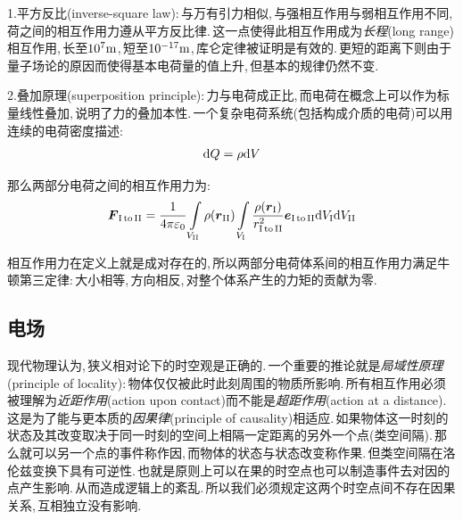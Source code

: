 1.{\hei 平方反比(inverse-square law)}:\,与万有引力相似,\,与强相互作用与弱相互作用不同,\,荷之间的相互作用力遵从平方反比律.\,这一点使得此相互作用成为\emph{长程}(long range)相互作用,\,长至\(10^7{\rm m}\),\,短至\(10^{-17}{\rm m}\),\,库仑定律被证明是有效的.\,更短的距离下则由于量子场论的原因而使得基本电荷量的值上升,\,但基本的规律仍然不变.

2.{\hei 叠加原理(superposition principle)}:\,力与电荷成正比,\,而电荷在概念上可以作为标量线性叠加,\,说明了力的叠加本性.\,一个复杂电荷系统(包括构成介质的电荷)可以用连续的电荷密度描述:
\[\textrm{d} Q=\rho \textrm{d} V\]
	
那么两部分电荷之间的相互作用力为:
\[\boldsymbol{F}_{\rm I\,to\,II}=\frac{1}{4\pi\varepsilon_0}\int\limits_{V_{\rm II}}\rho(\boldsymbol{r}_{\rm II})\int\limits_{V_{\rm I}}\frac{\rho(\boldsymbol{r}_{\rm I})}{r_{\rm I\,to\,II}^2}\boldsymbol{e}_{\rm I\,to\,II}\textrm{d} V_{\rm I}\textrm{d} V_{\rm II}\]

相互作用力在定义上就是成对存在的,\,所以两部分电荷体系间的相互作用力满足牛顿第三定律:\,大小相等,\,方向相反,\,对整个体系产生的力矩的贡献为零.

\vspace{1cm}
\subsection{电场}
现代物理认为,\,狭义相对论下的时空观是正确的.\,一个重要的推论就是\emph{局域性原理}(principle of locality):\,物体仅仅被此时此刻周围的物质所影响.\,所有相互作用必须被理解为\emph{近距作用}(action upon contact)而不能是\emph{超距作用}(action at a distance).\,这是为了能与更本质的\emph{因果律}(principle of causality)相适应.\,如果物体这一时刻的状态及其改变取决于同一时刻的空间上相隔一定距离的另外一个点(类空间隔).\,那么就可以另一个点的事件称作因,\,而物体的状态与状态改变称作果.\,但类空间隔在洛伦兹变换下具有可逆性.\,也就是原则上可以在果的时空点也可以制造事件去对因的点产生影响.\,从而造成逻辑上的紊乱.\,所以我们必须规定这两个时空点间不存在因果关系,\,互相独立没有影响.

